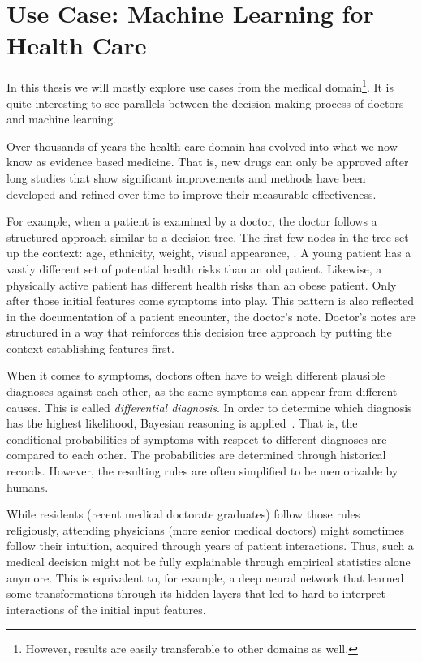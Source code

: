 \section{Use Case: Machine Learning for Health Care}
In this thesis we will mostly explore use cases from the medical domain\footnote{However, results are easily transferable to other domains as well.}.
It is quite interesting to see parallels between the decision making process of doctors and machine learning.

Over thousands of years the health care domain has evolved into what we now know as evidence based medicine.
That is, new drugs can only be approved after long studies that show significant improvements and methods have been developed and refined over time to improve their measurable effectiveness.

For example, when a patient is examined by a doctor, the doctor follows a structured approach similar to a decision tree.
The first few nodes in the tree set up the context: age, ethnicity, weight, visual appearance, \etc.
A young patient has a vastly different set of potential health risks than an old patient.
Likewise, a physically active patient has different health risks than an obese patient.
Only after those initial features come symptoms into play.
This pattern is also reflected in the documentation of a patient encounter, the doctor's note.
Doctor's notes are structured in a way that reinforces this decision tree approach by putting the context establishing features first.

When it comes to symptoms, doctors often have to weigh different plausible diagnoses against each other, as the same symptoms can appear from different causes.
This is called \emph{differential diagnosis}.
In order to determine which diagnosis has the highest likelihood, Bayesian reasoning is applied~\cite{mdbook}.
That is, the conditional probabilities of symptoms with respect to different diagnoses are compared to each other.
The probabilities are determined through historical records.
However, the resulting rules are often simplified to be memorizable by humans.

While residents (recent medical doctorate graduates) follow those rules religiously, attending physicians (more senior medical doctors) might sometimes follow their intuition, acquired through years of patient interactions.
Thus, such a medical decision might not be fully explainable through empirical statistics alone anymore.
This is equivalent to, for example, a deep neural network that learned some transformations through its hidden layers that led to hard to interpret interactions of the initial input features.
